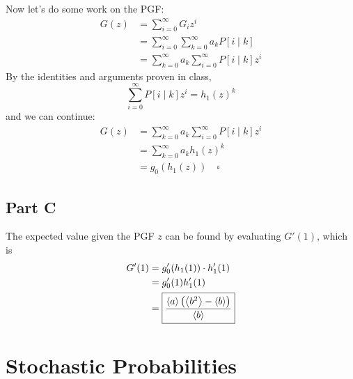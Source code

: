 \documentclass[12pt]{article}
\begin{document}
Now let's do some work on the PGF:
\begin{align*}
      G(z)
       & = \sum_{i=0}^{\infty} G_i z^i                                \\
       & = \sum_{i=0}^{\infty} \sum_{k=0}^{\infty} a_k P[i \mid k]    \\
       & = \sum_{k=0}^{\infty} a_k \sum_{i=0}^{\infty} P[i \mid k]z^i
\end{align*}
By the identities and arguments proven in class,
\[\sum_{i=0}^{\infty} P[i \mid k]z^i = h_1(z)^k\]
and we can continue:
\begin{align*}
      G(z)
       & = \sum_{k=0}^{\infty} a_k \sum_{i=0}^{\infty} P[i \mid k]z^i \\
       & = \sum_{k=0}^{\infty} a_k h_1(z)^k                           \\
       & = g_0(h_1(z))\quad\square
\end{align*}

\subsection{Part C}

The expected value given the PGF $z$ can be found by evaluating $G'(1)$, which is
\begin{align*}
      G'(1)
       & = g_0'(h_1(1)) \cdot h_1'(1)                                                \\
       & = g_0'(1)h_1'(1)                                                            \\
       & = \boxed{\frac{\braket{a}\left(\Braket{b^2}-\braket{b}\right)}{\braket{b}}}
\end{align*}

\pagebreak

\section{Stochastic Probabilities}
\end{document}
